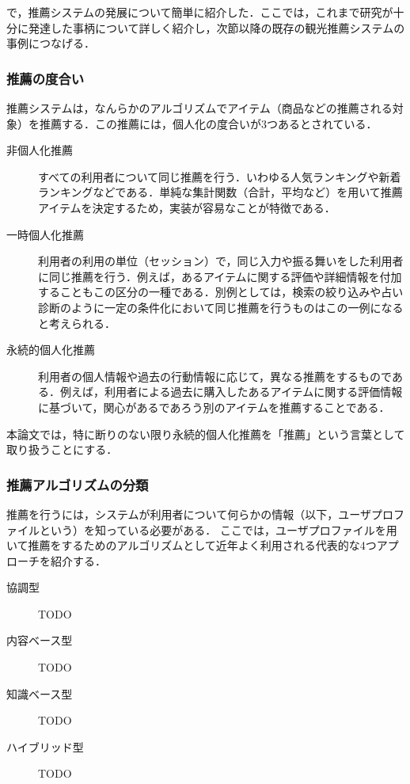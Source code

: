 \documentclass{jsarticle}
\begin{document}
\label{evolution_recommendation_system} で，推薦システムの発展について簡単に紹介した．ここでは，これまで研究が十分に発達した事柄について詳しく紹介し，次節以降の既存の観光推薦システムの事例につなげる．

\subsubsection{推薦の度合い}

推薦システムは，なんらかのアルゴリズムでアイテム（商品などの推薦される対象）を推薦する．この推薦には，個人化の度合いが3つあるとされている\cite{define_of_recommendation_system}\cite{recommendation_type_of_personalize}．

\begin{description}
\item[非個人化推薦] すべての利用者について同じ推薦を行う．いわゆる人気ランキングや新着ランキングなどである．単純な集計関数（合計，平均など）を用いて推薦アイテムを決定するため，実装が容易なことが特徴である．
\item[一時個人化推薦] 利用者の利用の単位（セッション）で，同じ入力や振る舞いをした利用者に同じ推薦を行う．例えば，あるアイテムに関する評価や詳細情報を付加することもこの区分の一種である．別例としては，検索の絞り込みや占い診断のように一定の条件化において同じ推薦を行うものはこの一例になると考えられる．
\item[永続的個人化推薦] 利用者の個人情報や過去の行動情報に応じて，異なる推薦をするものである．例えば，利用者による過去に購入したあるアイテムに関する評価情報に基づいて，関心があるであろう別のアイテムを推薦することである．
\end{description}

本論文では，特に断りのない限り永続的個人化推薦を「推薦」という言葉として取り扱うことにする．

\subsubsection{推薦アルゴリズムの分類}

推薦を行うには，システムが利用者について何らかの情報（以下，ユーザプロファイルという）を知っている必要がある．
ここでは，ユーザプロファイルを用いて推薦をするためのアルゴリズムとして近年よく利用される代表的な4つアプローチを紹介する．

\begin{description}
\item[協調型] TODO
\item[内容ベース型] TODO
\item[知識ベース型] TODO
\item[ハイブリッド型] TODO
\end{description}
\end{document}
